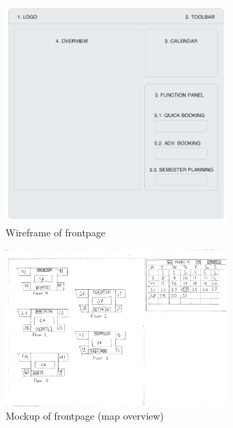 \begin{figure}[htb]
\begin{center}
\leavevmode
\includegraphics[width=0.75\textwidth]{images/wireframe1}
\end{center}
\caption{Wireframe of frontpage}
\label{fig:app1_wire1}
\end{figure}

\begin{figure}[htb]
\begin{center}
\leavevmode
\includegraphics[width=0.75\textwidth]{images/overview1}
\end{center}
\caption{Mockup of frontpage (map overview)}
\label{fig:app1_mock2_3}
\end{figure}

